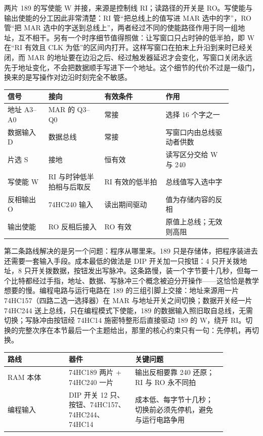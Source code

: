两片 189 的写使能 W 并接，来源是控制线 RI；读路径的开关是 RO。写使能与输出使能的分工因此非常清楚：RI 管“把总线上的值写进 MAR 选中的字”，RO 管“把 MAR 选中的字送到总线上”，两者经过不同的使能路径作用于同一组地址，互不相干。另有一个时序细节值得照做：让写窗口只占时钟的低半拍，即 W 在“RI 有效且 CLK 为低”的区间内打开。这样写窗口在拍末上升沿到来时已经关闭，而 MAR 的地址要在边沿之后、经过触发器延迟才会变化，写窗口关闭永远先于地址变化，不会把数据顺手写进下一个地址。这个细节的代价不过是一级门，换来的是写操作对边沿时刻完全不敏感。

\begin{longtable}{L{0.16\linewidth}L{0.22\linewidth}L{0.24\linewidth}L{0.26\linewidth}}
\toprule
信号 & 接向 & 有效条件 & 作用 \\
\midrule
地址 A3–A0 & MAR 的 Q3–Q0 & 常接 & 选择 16 个字之一 \\\tablerowrule
数据输入 D & 数据总线 & 常接 & 写窗口内由总线驱动者供数 \\\tablerowrule
片选 S & 接地 & 恒有效 & 读写区分交给 W 与 240 \\\tablerowrule
写使能 W & RI 与时钟低半拍相与后取反 & RI 有效的低半拍 & 总线值写入选中字 \\\tablerowrule
反相输出 O & 74HC240 输入 & 读出期间驱动 & 值为存储内容的反相 \\ 输出使能 & RO 反相后接入 & RO 有效 & 原值上总线；无效则高阻 \\
\bottomrule
\end{longtable}

第二条路线解决的是另一个问题：程序从哪里来。189 只是存储体，把程序装进去还需要一套输入手段。成本最低的做法是 DIP 开关加一只按钮：4 只开关拨地址，8 只开关拨数据，按钮发出写脉冲。这条路慢，装一个字节要十几秒，但每一个比特都经过手指，地址、数据、写脉冲三个概念被迫分开操作——这恰恰是教学想要的慢。编程电路与运行电路在 189 的三组引脚上交接：地址来源用一片 74HC157（四路二选一选择器）在 MAR 与地址开关之间切换；数据开关经一片 74HC244 送上总线，只在编程模式下使能，189 的数据输入照旧取自总线，无需切换；写脉冲由按钮经 74HC14 施密特整形后直接驱动 189 的 W，绕开 RI。切换的完整次序在本节最后一个主题给出，那里的核心约束只有一句：先停机，再切换。

\begin{longtable}{L{0.24\linewidth}L{0.26\linewidth}L{0.36\linewidth}}
\toprule
路线 & 器件 & 关键问题 \\
\midrule
RAM 本体 & 74HC189 两片 + 74HC240 一片 & 输出反相要靠 240 还原；RI 与 RO 永不同拍 \\\tablerowrule
编程输入 & DIP 开关 12 只、按钮、74HC157、74HC244、74HC14 & 成本低、每字节十几秒；切换前必须先停机，避免与运行电路争用 \\
\bottomrule
\end{longtable}


